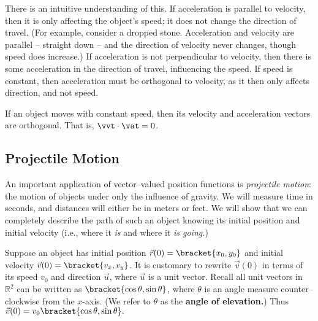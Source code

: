 There is an intuitive understanding of this. If acceleration is parallel to velocity, then it is only affecting the object's speed; it does not change the direction of travel. (For example, consider a dropped stone. Acceleration and velocity are parallel -- straight down -- and the direction of velocity never changes, though speed does increase.) If acceleration is not perpendicular to velocity, then there is some acceleration in the direction of travel, influencing the speed. If speed is constant, then acceleration must be orthogonal to velocity, as it then only affects direction, and not speed.

{If an object moves with constant speed, then its velocity and acceleration vectors are orthogonal. That is, $\vvt\cdot\vat=0$.
}


\subsection{Projectile Motion}

An important application of vector--valued position functions is \emph{projectile motion}: the motion of objects under only the influence of gravity. We will measure time in seconds, and distances will either be in meters or feet. We will show that we can completely describe the path of such an object knowing its initial position and initial velocity (i.e., where it \emph{is} and where it \emph{is going.})

Suppose an object has initial position $\vec r(0) =\bracket{x_0,y_0}$ and initial velocity $\vec v(0) =\bracket{v_x,v_y}$. It is customary to rewrite $\vec v(0)$ in terms of its speed $v_0$ and direction $\vec u$, where $\vec u$ is a unit vector. Recall all unit vectors in $\mathbb{R}^2$ can be written as $\bracket{\cos \theta,\sin \theta}$, where $\theta$ is an angle measure counter--clockwise from the $x$-axis. (We refer to $\theta$ as the \textbf{angle of elevation.}) Thus $\vec v(0) = v_0\bracket{\cos \theta,\sin \theta}.$ 

